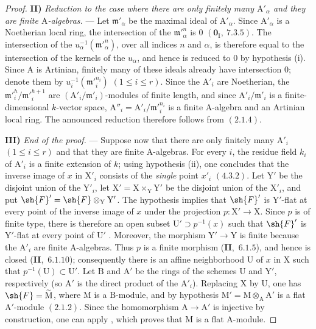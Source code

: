 \begin{proof}
\medskip
\noindent\textbf{II)} \emph{Reduction to the case where there are only finitely many $\mathrm{A}'_\alpha$ and they are finite $\mathrm{A}$-algebras.} --- Let $\mathfrak{m}'_\alpha$ be
the maximal ideal of $\mathrm{A}'_\alpha$. Since $\mathrm{A}'_\alpha$ is a Noetherian local ring, the intersection of the $\mathfrak{m}'^n_\alpha$
is $0$ $(\mathbf{0}_\mathrm{I},~7.3.5)$. The intersection of the $u_\alpha^{-1}(\mathfrak{m}'^n_\alpha)$, over all indices $n$ and $\alpha$, is therefore
equal to the intersection of the kernels of the $u_\alpha$, and hence is reduced to $0$ by hypothesis (i). Since $\mathrm{A}$
is Artinian, finitely many of these ideals already have intersection $0$; denote them by
$u_i^{-1}(\mathfrak{m}'^{n_i}_i)$ $(1\leq i\leq r)$. Since the $\mathrm{A}'_i$ are Noetherian, the $\mathfrak{m}'^h_i/\mathfrak{m}'^{h+1}_i$ are
$(\mathrm{A}'_i/\mathfrak{m}'_i)$-modules of finite length, and since $\mathrm{A}'_i/\mathfrak{m}'_i$ is a finite-dimensional $k$-vector space,
$\mathrm{A}''_i=\mathrm{A}'_i/\mathfrak{m}'^{n_i}_i$ is a finite $\mathrm{A}$-algebra and an Artinian local ring. The announced reduction
therefore follows from $(2.1.4)$.

\medskip
\noindent\textbf{III)} \emph{End of the proof.} --- Suppose now that there are only finitely many $\mathrm{A}'_i$ $(1\leq i\leq r)$ and that
they are finite $\mathrm{A}$-algebras. For every $i$, the residue field $k_i$ of $\mathrm{A}'_i$ is a finite extension of $k$; using
hypothesis (ii), one concludes that the inverse image of $x$ in $\mathrm{X}'_i$ consists of the \emph{single} point $x'_i$ $(4.3.2)$.
Let $\mathrm{Y}'$ be the disjoint union of the $\mathrm{Y}'_i$, let $\mathrm{X}'=\mathrm{X}\times_\mathrm{Y}\mathrm{Y}'$ be the disjoint union of the
$\mathrm{X}'_i$, and put $\sh{F}'=\sh{F}\otimes_\mathrm{Y}\mathrm{Y}'$. The hypothesis implies that $\sh{F}'$ is $\mathrm{Y}'$-flat at every
point of the inverse image of $x$ under the projection $p:\mathrm{X}'\to\mathrm{X}$. Since $p$ is of finite type, there is therefore an
open subset $\mathrm{U}'\supset p^{-1}(x)$ such that $\sh{F}'$ is $\mathrm{Y}'$-flat at every point of $\mathrm{U}'$ .
Moreover, the morphism $\mathrm{Y}'\to\mathrm{Y}$ is finite because the $\mathrm{A}'_i$ are finite $\mathrm{A}$-algebras. Thus $p$ is a finite
morphism (\textbf{II},~$6.1.5$), and hence is closed (\textbf{II},~$6.1.10$); consequently there is an affine neighborhood $\mathrm{U}$ of
$x$ in $\mathrm{X}$ such that $p^{-1}(\mathrm{U})\subset\mathrm{U}'$. Let $\mathrm{B}$ and $\mathrm{A}'$ be the rings of the schemes
$\mathrm{U}$ and $\mathrm{Y}'$, respectively (so $\mathrm{A}'$ is the direct product of the $\mathrm{A}'_i$). Replacing $\mathrm{X}$ by
$\mathrm{U}$, one has $\sh{F}=\widetilde{\mathrm{M}}$, where $\mathrm{M}$ is a $\mathrm{B}$-module, and by hypothesis
$\mathrm{M}'=\mathrm{M}\otimes_\mathrm{A}\mathrm{A}'$ is a flat $\mathrm{A}'$-module $(2.1.2)$. Since the homomorphism
$\mathrm{A}\to\mathrm{A}'$ is injective by construction, one can apply , which proves that $\mathrm{M}$ is a flat
$\mathrm{A}$-module.
\end{proof}

